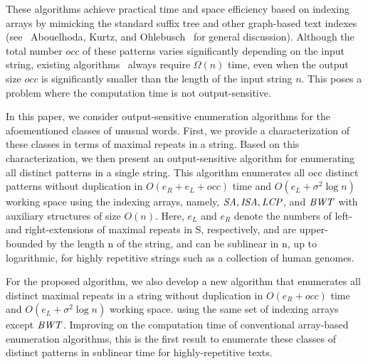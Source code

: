 These algorithms achieve practical time and space efficiency based on indexing arrays by mimicking the standard suffix tree and other graph-based text indexes (see ~Abouelhoda, Kurtz, and Ohlebusch~\cite{abouelhoda2004replacing} for general discussion). Although the total number $occ$ of these patterns varies significantly depending on the input string, existing algorithms~\cite{garcia2011minimal,ilie2011minimum,belazzougui:cunial:gagie:prezza:raffinot2015composite,narisawa2017efficient,belazzougui2015space:unusual} always require $\Omega(n)$ time, even when the output size $occ$ is significantly smaller than the length of the input string $n$. This poses a problem where the computation time is not output-sensitive.

In this paper, we consider output-sensitive enumeration algorithms for the afoementioned classes of unusual words. First, we provide a characterization of these classes in terms of maximal repeats in a string. Based on this characterization, we then present an output-sensitive algorithm for enumerating all distinct patterns in a single string. This algorithm enumerates all occ distinct patterns without duplication
in $O(e_R + e_L + occ)$ time and $O(e_L  + \sigma^2 \log n)$ working space using the indexing arrays, namely, $\mathit{SA}, \mathit{ISA}, \mathit{LCP}$, and $\mathit{BWT}$ with auxiliary structures of size $O(n)$. 
Here, $e_L$ and $e_R$ denote the numbers of left- and right-extensions of maximal repeats in S, respectively, and are upper-bounded by the length n of the string, and can be sublinear in n, up to logarithmic, for highly repetitive strings such as a collection of human genomes.

For the proposed algorithm, we also develop a new algorithm that enumerates all distinct maximal repeats in a string without duplication
in $O(e_R + occ)$ time and $O(e_L + \sigma^2 \log n)$ working space.
using the same set of indexing arrays except $\mathit{BWT}$.
Improving on the computation time of conventional array-based enumeration algorithms, this is the first result to enumerate these classes of distinct patterns in sublinear time for highly-repetitive texts.

